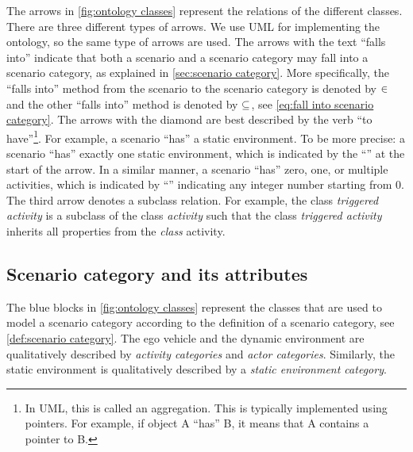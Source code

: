 The arrows in \cref{fig:ontology classes} represent the relations of the different classes. 
There are three different types of arrows. 
We use UML for implementing the ontology, so the same type of arrows are used.
The arrows with the text ``falls into'' indicate that both a scenario and a scenario category may fall into a scenario category, as explained in \cref{sec:scenario category}. \cbstartc More specifically, the ``falls into'' method from the scenario to the scenario category is denoted by $\in$ and the other ``falls into'' method is denoted by $\subseteq$, see \cref{eq:fall into scenario category}. \cbend 
The arrows with the diamond are best described by the verb ``to have''\footnote{In UML, this is called an aggregation. \cbstartb This is typically implemented using pointers. For example, if object A ``has'' B, it means that A contains a pointer to B.\cbend}. For example, a scenario ``has'' a static environment. To be more precise: a scenario ``has'' exactly one static environment, which is indicated by the ``\hasone'' at the start of the arrow. In a similar manner, a scenario ``has'' zero, one, or multiple activities, which is indicated by ``\hasn'' indicating any integer number starting from 0. The third arrow denotes a subclass relation. For example, the class \textit{triggered activity} is a subclass of the class \textit{activity} such that the class \textit{triggered activity} inherits all properties from the \textit{class} activity.



\subsection{Scenario category and its attributes}
\label{sec:domain scenario category}

The blue blocks in \cref{fig:ontology classes} represent the classes that are used to model a scenario category according to the definition of a scenario category, see \cref{def:scenario category}. 
The ego vehicle and the dynamic environment are qualitatively described by \textit{activity categories} and \textit{actor categories}. Similarly, the static environment is qualitatively described by a \textit{static environment category}. 

